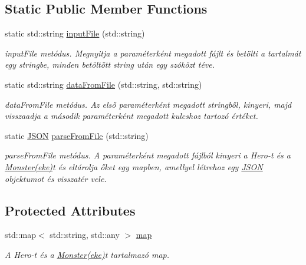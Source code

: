 \subsection*{Static Public Member Functions}
\begin{DoxyCompactItemize}
\item 
\mbox{\label{classJSON_a13577194c8ba3bfb544168f306a33f83}} 
static std\+::string \hyperlink{classJSON_a13577194c8ba3bfb544168f306a33f83}{input\+File} (std\+::string)
\begin{DoxyCompactList}\small\item\em input\+File metódus. Megnyitja a paraméterként megadott fájlt és betölti a tartalmát egy stringbe, minden betöltött string után egy szóközt téve. \end{DoxyCompactList}\item 
\mbox{\label{classJSON_a196e7e19e4a6d762cddda6dd71237a63}} 
static std\+::string \hyperlink{classJSON_a196e7e19e4a6d762cddda6dd71237a63}{data\+From\+File} (std\+::string, std\+::string)
\begin{DoxyCompactList}\small\item\em data\+From\+File metódus. Az első paraméterként megadott stringből, kinyeri, majd visszaadja a második paraméterként megadott kulcshoz tartozó értéket. \end{DoxyCompactList}\item 
\mbox{\label{classJSON_a88b145f10f9784da452b895bc327f358}} 
static \hyperlink{classJSON}{J\+S\+ON} \hyperlink{classJSON_a88b145f10f9784da452b895bc327f358}{parse\+From\+File} (std\+::string)
\begin{DoxyCompactList}\small\item\em parse\+From\+File metódus. A paraméterként megadott fájlból kinyeri a Hero-\/t és a \hyperlink{classMonster}{Monster(eke)}t és eltárolja őket egy mapben, amellyel létrehoz egy \hyperlink{classJSON}{J\+S\+ON} objektumot és visszatér vele. \end{DoxyCompactList}\end{DoxyCompactItemize}
\subsection*{Protected Attributes}
\begin{DoxyCompactItemize}
\item 
\mbox{\label{classJSON_a017be2f0262f19e399ba1e86b9a5144a}} 
std\+::map$<$ std\+::string, std\+::any $>$ \hyperlink{classJSON_a017be2f0262f19e399ba1e86b9a5144a}{map}
\begin{DoxyCompactList}\small\item\em A Hero-\/t és a \hyperlink{classMonster}{Monster(eke)}t tartalmazó map. \end{DoxyCompactList}\end{DoxyCompactItemize}


